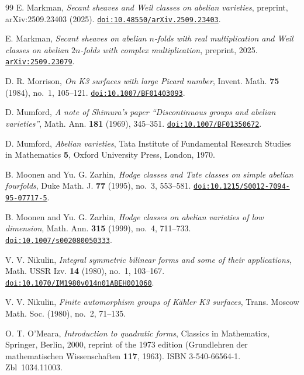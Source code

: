 \documentclass[11pt,reqno]{amsart}
\numberwithin{equation}{section}
\theoremstyle{plain}
\theoremstyle{definition}
\begin{document}
\begin{thebibliography}{99}
E. Markman,
\emph{Secant sheaves and Weil classes on abelian varieties},
preprint, arXiv:2509.23403 (2025).
\href{https://doi.org/10.48550/arXiv.2509.23403}{\nolinkurl{doi:10.48550/arXiv.2509.23403}}.

E. Markman,
\emph{Secant sheaves on abelian $n$-folds with real multiplication and Weil
classes on abelian $2n$-folds with complex multiplication},
preprint, 2025.
\href{https://arxiv.org/abs/2509.23079}{\nolinkurl{arXiv:2509.23079}}.

D. R. Morrison,
\emph{On K3 surfaces with large Picard number},
Invent. Math. \textbf{75} (1984), no.~1, 105--121.
\href{https://doi.org/10.1007/BF01403093}{\nolinkurl{doi:10.1007/BF01403093}}.

D. Mumford,
\emph{A note of Shimura's paper ``Discontinuous groups and abelian
varieties''},
Math. Ann. \textbf{181} (1969), 345--351.
\href{https://doi.org/10.1007/BF01350672}{\nolinkurl{doi:10.1007/BF01350672}}.

D. Mumford,
\emph{Abelian varieties},
Tata Institute of Fundamental Research Studies in Mathematics \textbf{5}, Oxford University Press, London, 1970.

B. Moonen and Yu. G. Zarhin,
\emph{Hodge classes and Tate classes on simple abelian fourfolds},
Duke Math. J. \textbf{77} (1995), no.~3, 553--581.
\href{https://doi.org/10.1215/S0012-7094-95-07717-5}{\nolinkurl{doi:10.1215/S0012-7094-95-07717-5}}.

B. Moonen and Yu. G. Zarhin,
\emph{Hodge classes on abelian varieties of low dimension},
Math. Ann. \textbf{315} (1999), no.~4, 711--733.
\href{https://doi.org/10.1007/s002080050333}{\nolinkurl{doi:10.1007/s002080050333}}.

V. V. Nikulin,
\emph{Integral symmetric bilinear forms and some of their applications},
Math. USSR Izv. \textbf{14} (1980), no.~1, 103--167.
\href{https://doi.org/10.1070/IM1980v014n01ABEH001060}{\nolinkurl{doi:10.1070/IM1980v014n01ABEH001060}}.

V. V. Nikulin,
\emph{Finite automorphism groups of K\"ahler K3 surfaces},
Trans. Moscow Math. Soc. (1980), no.~2, 71--135.

O. T. O'Meara,
\emph{Introduction to quadratic forms},
Classics in Mathematics, Springer, Berlin, 2000, reprint of the 1973 edition (Grundlehren der mathematischen Wissenschaften \textbf{117}, 1963). ISBN 3-540-66564-1. Zbl~1034.11003.


\end{thebibliography}
\end{document}
